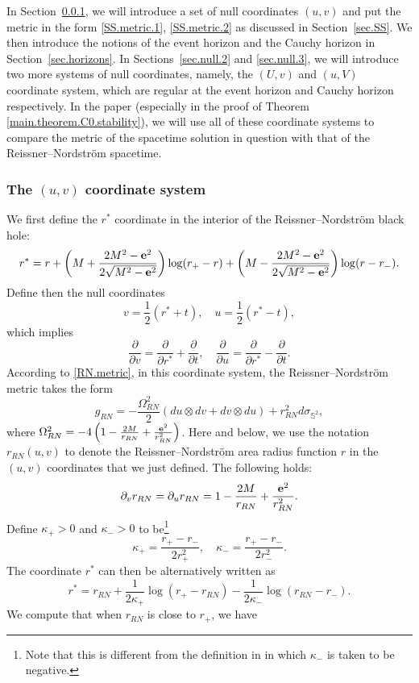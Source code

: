 \documentclass[10pt, reqno]{amsart}
\theoremstyle{definition}
\theoremstyle{remark}
\numberwithin{equation}{section}
\newcommand{\rd}{\partial}
\newcommand{\0}{\emptyset}
\newcommand{\Omg}{\Omega}
\newcommand{\f}{\frac}
\begin{document}
In Section~\ref{sec.null.1}, we will introduce a set of null coordinates $(u,v)$ and put the metric in the form \eqref{SS.metric.1}, \eqref{SS.metric.2} as discussed in Section~\ref{sec.SS}. We then introduce the notions of the event horizon and the Cauchy horizon in Section~\ref{sec.horizons}. In Sections~\ref{sec.null.2} and \ref{sec.null.3}, we will introduce two more systems of null coordinates, namely, the $(U,v)$ and $(u,V)$ coordinate system, which are regular at the event horizon and Cauchy horizon respectively. In the paper (especially in the proof of Theorem \ref{main.theorem.C0.stability}), we will use all of these coordinate systems to compare the metric of the spacetime solution in question with that of the Reissner--Nordstr\"om spacetime.
 
\subsubsection{The $(u,v)$ coordinate system}\label{sec.null.1}
We first define the $r^*$ coordinate in the interior of the Reissner--Nordstr\"om black hole:
$$r^*=r+ \left( M+\frac{2M^2-{\bf e}^2}{2\sqrt{M^2-{\bf e}^2}} \right) \log (r_+-r) + \left( M-\frac{2M^2-{\bf e}^2}{2\sqrt{M^2-{\bf e}^2}} \right)\log (r-r_-).$$
Define then the null coordinates
$$v=\frac 12(r^*+t),\quad u=\frac 12(r^*-t),$$
which implies
$$\frac{\rd}{\rd v}= \frac{\rd}{\rd r^*}+\frac{\rd}{\rd t},\quad\frac{\rd}{\rd u}= \frac{\rd}{\rd r^*}-\frac{\rd}{\rd t}.$$
According to \eqref{RN.metric}, in this coordinate system, the Reissner--Nordstr\"{o}m metric takes the form
$$g_{RN}=-\f{\Omg_{RN}^2}{2} (du\otimes dv+dv\otimes du)+ r_{RN}^2 d\sigma_{\mathbb S^2},$$
where $\Omg_{RN}^2=-4\left(1-\frac{2M}{r_{RN}}+\frac{{\bf e}^2}{r_{RN}^2}\right)$. Here and below, we use the notation $r_{RN}(u,v)$ to denote the Reissner--Nordstr\"om area radius function $r$ in the $(u,v)$ coordinates that we just defined. The following holds:
\begin{equation}\label{int.r}
\rd_v r_{RN}=\rd_u r_{RN}=1-\f{2M}{r_{RN}}+\f{{\bf e}^2}{r_{RN}^2}.
\end{equation}
Define $\kappa_+>0$ and $\kappa_->0$ to be\footnote{Note that this is different from the definition in \cite{LO.instab} in which $\kappa_-$ is taken to be negative.} 
$$\kappa_+=\f{r_+-r_-}{2 r_+^2},\quad \kappa_-=\f{r_+-r_-}{2 r_-^2}.$$
The coordinate $r^*$ can then be alternatively written as
$$r^*=r_{RN}+\f{1}{2\kappa_+}\log (r_+-r_{RN}) -\f{1}{2\kappa_-}\log (r_{RN}-r_-).$$
We compute that when $r_{RN}$ is close to $r_+$, we have
\end{document}
